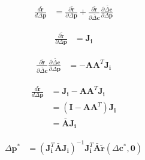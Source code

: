 \begin{equation}
    \begin{aligned}
        \frac{d \tilde{\mathbf{r}}}{d \Delta \mathbf{p}} & = \frac{\partial \tilde{\mathbf{r}}}{\partial \Delta \mathbf{p}} + \frac{\partial \tilde{\mathbf{r}}}{\partial \tilde{\Delta \mathbf{c}}} \frac{\partial \tilde{\Delta \mathbf{c}}}{\partial \Delta \mathbf{p}}
    \label{eq:wiberg_forward}
    \end{aligned}
\end{equation}

\begin{equation}
    \begin{aligned}
        \frac{\partial \tilde{\mathbf{r}}}{\partial \Delta \mathbf{p}} &= \mathbf{J}_{\mathbf{i}}
    \label{eq:wiberg_forward1}
    \end{aligned}
\end{equation}

\begin{equation}
    \begin{aligned}
        \frac{\partial \tilde{\mathbf{r}}}{\partial \tilde{\Delta \mathbf{c}}} \frac{\partial \tilde{\Delta \mathbf{c}}}{\partial \Delta \mathbf{p}} & = - \mathbf{A}\mathbf{A}^T\mathbf{J}_{\mathbf{i}}
    \label{eq:wiberg_forward2}
    \end{aligned}
\end{equation}

\begin{equation}
    \begin{aligned}
        \frac{d \tilde{\mathbf{r}}}{d \Delta \mathbf{p}} & = \mathbf{J}_{\mathbf{i}} - \mathbf{A} \mathbf{A}^T \mathbf{J}_{\mathbf{i}}
        \\
        & = (\mathbf{I} - \mathbf{A} \mathbf{A}^T) \mathbf{J}_{\mathbf{i}}
        \\
        & = \bar{\mathbf{A}} \mathbf{J}_{\mathbf{i}}
    \label{eq:wiberg_forward}
    \end{aligned}
\end{equation}

\begin{equation}
    \begin{aligned}
        \Delta \mathbf{p}^* & = \left( \mathbf{J}_{\mathbf{i}}^T \bar{\mathbf{A}} \mathbf{J}_{\mathbf{i}} \right)^{-1} \mathbf{J}_{\mathbf{i}}^T \bar{\mathbf{A}} \tilde{\mathbf{r}}(\Delta\mathbf{c}^*, \mathbf{0})
    \label{eq:wiberg_appearance}
    \end{aligned}
\end{equation}

